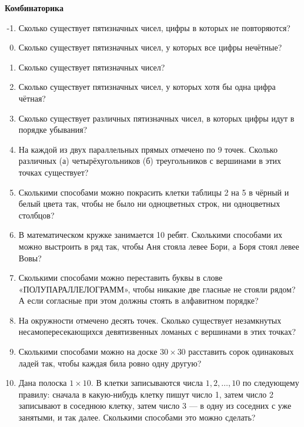 \documentclass{article}
\begin{document}
\large
	
	
\begin{center}
	\textbf{Комбинаторика}
\end{center}



\begin{enumerate}[label*=\protect\fbox{\arabic{enumi}}]
	
\setcounter{enumi}{-2}
\item Сколько существует пятизначных чисел, цифры в которых не повторяются?
\item Сколько существует пятизначных чисел, у которых все цифры нечётные?
\item Сколько существует пятизначных чисел?
\item Сколько существует пятизначных чисел, у которых хотя бы одна цифра чётная?
\item Сколько существует различных пятизначных чисел, в которых цифры идут в порядке убывания?
\item На каждой из двух параллельных прямых отмечено по 9 точек. Сколько различных (а) четырёхугольников (б) треугольников с вершинами в этих точках существует?
\item Сколькими способами можно покрасить клетки таблицы 2 на 5 в чёрный и белый цвета так, чтобы не было ни одноцветных строк, ни одноцветных столбцов?
\item В математическом кружке занимается 10 ребят. Сколькими способами их можно
выстроить в ряд так, чтобы Аня стояла левее Бори, а Боря стоял левее Вовы?
\item Сколькими способами можно переставить буквы в слове
«ПОЛУПАРАЛЛЕЛОГРАММ», чтобы никакие две гласные не стояли рядом? А если согласные при этом должны стоять в алфавитном порядке?
\item На окружности отмечено десять точек. Сколько существует незамкнутых несамопересекающихся девятизвенных ломаных с вершинами в этих точках?
\item Сколькими способами можно на доске $30 \times 30$ расставить сорок одинаковых ладей так, чтобы каждая била ровно одну другую?

\item Дана полоска $1 \times 10$. В клетки записываются числа $1, 2, \dotsc , 10$ по следующему правилу: сначала в какую-нибудь клетку пишут число 1, затем число 2 записывают в соседнюю клетку, затем число 3 — в одну из соседних с уже занятыми, и так далее. Сколькими способами это можно сделать?


\end{enumerate}
\end{document}

